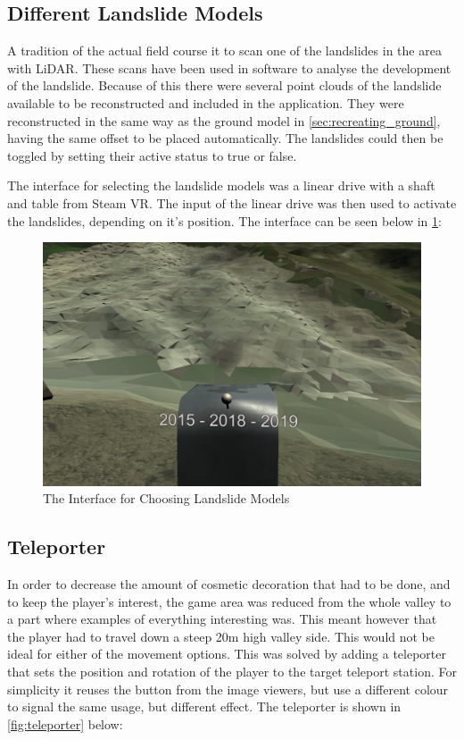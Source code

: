    \subsection{Different Landslide Models}
        A tradition of the actual field course it to scan one of the landslides in the area with LiDAR. These scans have been used in software to analyse the development of the landslide. Because of this there were several point clouds of the landslide available to be reconstructed and included in the application. They were reconstructed in the same way as the ground model in \cref{sec:recreating_ground}, having the same offset to be placed automatically. The landslides could then be toggled by setting their active status to true or false.
        
        The interface for selecting the landslide models was a linear drive with a shaft and table from Steam VR. The input of the linear drive was then used to activate the landslides, depending on it's position. The interface can be seen below in \cref{fig:landslide_handler}:
        
        \FloatBarrier
        \begin{figure}
            \centering
            \includegraphics[width=\ImageWidth]{figures/landslide_handler_2.PNG}
            \caption{The Interface for Choosing Landslide Models}
            \label{fig:landslide_handler}
        \end{figure}
        \FloatBarrier
        
    
    \subsection{Teleporter}
        In order to decrease the amount of cosmetic decoration that had to be done, and to keep the player's interest, the game area was reduced from the whole valley to a part where examples of everything interesting was. This meant however that the player had to travel down a steep 20m high valley side. This would not be ideal for either of the movement options. This was solved by adding a teleporter that sets the position and rotation of the player to the target teleport station. For simplicity it reuses the button from the image viewers, but use a different colour to signal the same usage, but different effect. The teleporter is shown in \cref{fig:teleporter} below:
        

